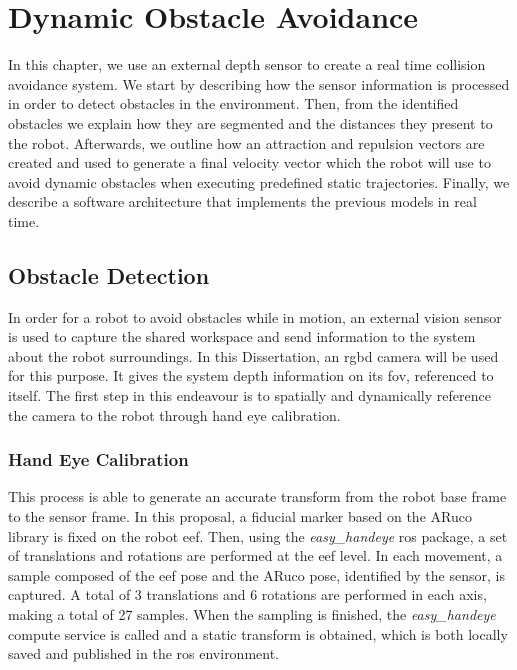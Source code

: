 \chapter{Dynamic Obstacle Avoidance}
\label{chp:4-obstacle}

\par In this chapter, we use an external depth sensor to create a real time collision avoidance system. We start by describing how the sensor information is processed in order to detect obstacles in the environment. Then, from the identified obstacles we explain how they are segmented and the distances they present to the robot. Afterwards, we outline how an attraction and repulsion vectors are created and used to generate a final velocity vector which the robot will use to avoid dynamic obstacles when executing predefined static trajectories. Finally, we describe a software architecture that implements the previous models in real time.






\section{Obstacle Detection}
\label{section:obstacle-detection}

\par In order for a robot to avoid obstacles while in motion, an external vision sensor is used to capture the shared workspace and send information to the system about the robot surroundings. In this Dissertation, an \ac{rgbd} camera will be used for this purpose. It gives the system depth information on its \ac{fov}, referenced to itself. The first step in this endeavour is to spatially and dynamically reference the camera to the robot through hand eye calibration. 



\subsection{Hand Eye Calibration}

\par This process is able to generate an accurate transform from the robot base frame to the sensor frame. In this proposal, a fiducial marker based on the ARuco library \cite{aruco} is fixed on the robot \ac{eef}. Then, using the \textit{easy\_handeye} \ac{ros} package, a set of translations and rotations are performed at the \ac{eef} level. In each movement, a sample composed of the \ac{eef} pose and the ARuco pose, identified by the sensor, is captured. A total of 3 translations and 6 rotations are performed in each axis, making a total of 27 samples. When the sampling is finished, the \textit{easy\_handeye} compute service is called and a static transform is obtained, which is both locally saved and published in the \ac{ros} environment.

